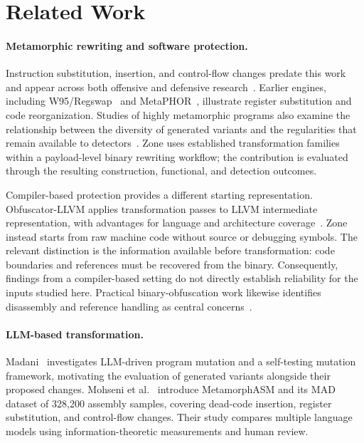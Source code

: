 \section{Related Work}\label{sect:related_work}
\paragraph{Metamorphic rewriting and software protection.}
Instruction substitution, insertion, and control-flow changes predate
this work and appear across both offensive and defensive
research~\cite{survey1,survey2}. Earlier engines, including
W95/Regswap~\cite{desai2010highly} and MetaPHOR~\cite{MetaPHOR}, illustrate
register substitution and code reorganization. Studies of highly
metamorphic programs also examine the relationship between the diversity
of generated variants and the regularities that remain available to
detectors~\cite{desai2008towards,desai2010highly,szor2001hunting}.
Zone uses established transformation families within a payload-level
binary rewriting workflow; the contribution is evaluated through the
resulting construction, functional, and detection outcomes.

Compiler-based protection provides a different starting representation.
Obfuscator-LLVM applies transformation passes to LLVM intermediate
representation, with advantages for language and architecture
coverage~\cite{llvmobf}. Zone instead starts from raw machine code without
source or debugging symbols. The relevant distinction is the information
available before transformation: code boundaries and references must be
recovered from the binary. Consequently, findings from a compiler-based
setting do not directly establish reliability for the inputs studied here.
Practical binary-obfuscation work likewise identifies disassembly and
reference handling as central concerns~\cite{bin2binobf}.

\paragraph{LLM-based transformation.}
Madani~\cite{llm2} investigates LLM-driven program mutation and a
self-testing mutation framework, motivating the evaluation of generated
variants alongside their proposed changes. Mohseni et al.~\cite{llmobf}
introduce MetamorphASM and its MAD dataset of 328,200 assembly samples,
covering dead-code insertion, register substitution, and control-flow
changes. Their study compares multiple language models using
information-theoretic measurements and human review.

